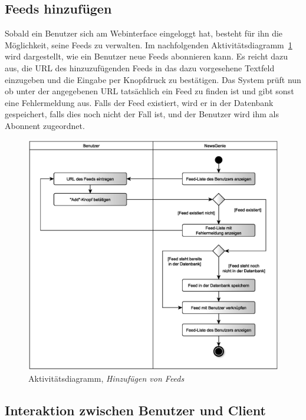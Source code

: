 \subsection{Feeds hinzufügen}

Sobald ein Benutzer sich am Webinterface eingeloggt hat, besteht für ihn die Möglichkeit, 
seine Feeds zu verwalten. Im nachfolgenden Aktivitätsdiagramm~\ref{1.4} wird dargestellt,
wie ein Benutzer neue Feeds abonnieren kann. Es reicht dazu aus, die URL des hinzuzufügenden 
Feeds in das dazu vorgesehene Textfeld einzugeben und die Eingabe per Knopfdruck zu bestätigen.
Das System prüft nun ob unter der angegebenen URL tatsächlich ein Feed zu finden ist und gibt sonst
eine Fehlermeldung aus. Falls der Feed existiert, wird er in der Datenbank gespeichert, falls dies noch nicht der Fall ist, und der Benutzer wird ihm als Abonnent zugeordnet.

\begin{figure}[h]
\centering
\includegraphics[width=1\textwidth]{Systementwurf/01_einleitung/addfeed.eps}
\caption{Aktivitätsdiagramm, \textit{Hinzufügen von Feeds}
\label{1.4}}
\end{figure}

\pagebreak[3]

\subsection{Interaktion zwischen Benutzer und Client}

